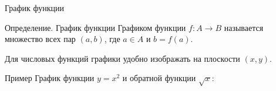 \documentclass[8pt]{beamer}
\begin{document}
\begin{frame}{График функции}
\begin{block}{Определение. График функции}
Графиком функции  $f: A \rightarrow B$ называется множество всех пар $(a,b)$, где $a\in A$ и $b=f(a)$.
\end{block}
Для числовых функций графики удобно изображать на плоскости $(x,y)$.
\begin{block}{Пример}
График функции $y=x^2$ и обратной функции $\sqrt{x}$:

\begin{center}

\end{center}
\end{block}
\end{frame}
\end{document}
